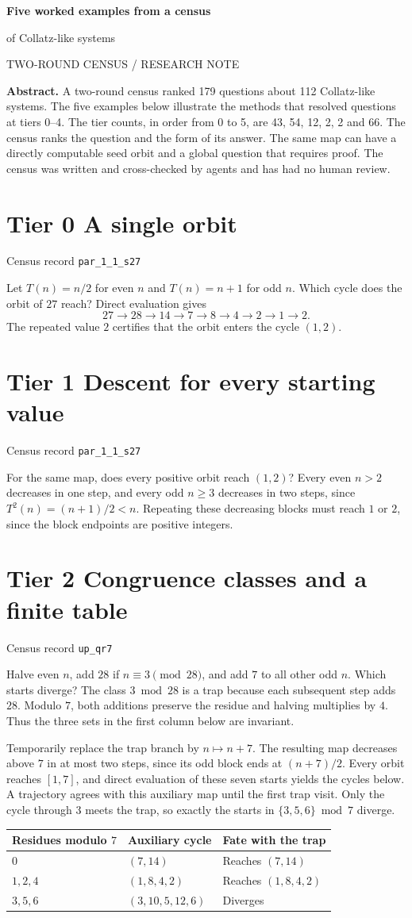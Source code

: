 \documentclass[11pt]{article}
\newcommand{\tier}[2]{%
  \section*{\color{accent}\sffamily Tier #1 \quad #2}%
}
\newcommand{\record}[1]{{\small\sffamily\color{accent} Census record \quad\texttt{#1}}\par}
\begin{document}
\color{ink}
{\LARGE\sffamily\bfseries Five worked examples from a census\par
of Collatz-like systems\par}
\vspace{5pt}
{\small\sffamily\color{accent} TWO-ROUND CENSUS \quad / \quad RESEARCH NOTE}
\vspace{5pt}

\textbf{Abstract.} A two-round census ranked 179 questions about 112 Collatz-like
systems. The five examples below illustrate the methods that resolved questions
at tiers 0--4. The tier counts, in order from 0 to 5, are 43, 54, 12, 2, 2 and 66.
The census ranks the question and the form of its answer. The same map can have
a directly computable seed orbit and a global question that requires proof.
The census was written and cross-checked by agents and has had no human review.

\tier{0}{A single orbit}
\record{par\_1\_1\_s27}
Let \(T(n)=n/2\) for even \(n\) and \(T(n)=n+1\) for odd \(n\).
Which cycle does the orbit of \(27\) reach? Direct evaluation gives
\[
27\to28\to14\to7\to8\to4\to2\to1\to2.
\]
The repeated value \(2\) certifies that the orbit enters the cycle \((1,2)\).

\tier{1}{Descent for every starting value}
\record{par\_1\_1\_s27}
For the same map, does every positive orbit reach \((1,2)\)?
Every even \(n>2\) decreases in one step, and every odd \(n\ge3\)
decreases in two steps, since \(T^2(n)=(n+1)/2<n\).
Repeating these decreasing blocks must reach \(1\) or \(2\), since the
block endpoints are positive integers.

\tier{2}{Congruence classes and a finite table}
\record{up\_qr7}
Halve even \(n\), add \(28\) if \(n\equiv3\pmod{28}\), and add \(7\) to all
other odd \(n\). Which starts diverge? The class \(3\bmod 28\) is a trap
because each subsequent step adds \(28\). Modulo \(7\), both additions
preserve the residue and halving multiplies by \(4\). Thus the three
sets in the first column below are invariant.

Temporarily replace the trap branch by \(n\mapsto n+7\). The resulting map
decreases above \(7\) in at most two steps, since its odd block ends at
\((n+7)/2\). Every orbit reaches \([1,7]\), and direct evaluation of these
seven starts yields the cycles below. A trajectory agrees with this auxiliary
map until the first trap visit. Only the cycle through \(3\) meets the trap,
so exactly the starts in \(\{3,5,6\}\bmod 7\) diverge.
\begin{center}
\small
\begin{tabular}{@{}lll@{}}
\toprule
Residues modulo \(7\)&Auxiliary cycle&Fate with the trap\\
\midrule
\(0\)&\((7,14)\)&Reaches \((7,14)\)\\
\(1,2,4\)&\((1,8,4,2)\)&Reaches \((1,8,4,2)\)\\
\(3,5,6\)&\((3,10,5,12,6)\)&Diverges\\
\bottomrule
\end{tabular}
\end{center}
\end{document}
